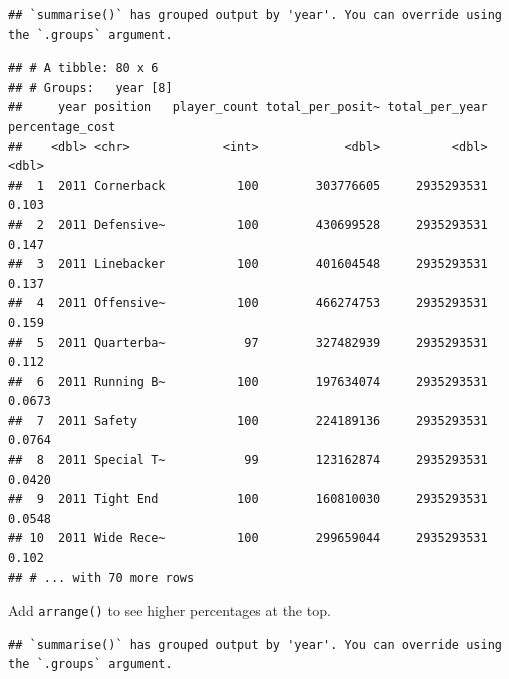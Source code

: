 \documentclass[
]{book}
\newenvironment{Shaded}{\begin{snugshade}}{\end{snugshade}}
\newcommand{\DataTypeTok}[1]{\textcolor[rgb]{0.13,0.29,0.53}{#1}}
\newcommand{\KeywordTok}[1]{\textcolor[rgb]{0.13,0.29,0.53}{\textbf{#1}}}
\newcommand{\NormalTok}[1]{#1}
\newcommand{\OperatorTok}[1]{\textcolor[rgb]{0.81,0.36,0.00}{\textbf{#1}}}
\newcommand{\StringTok}[1]{\textcolor[rgb]{0.31,0.60,0.02}{#1}}
\begin{document}
\begin{verbatim}
## `summarise()` has grouped output by 'year'. You can override using the `.groups` argument.
\end{verbatim}

\begin{verbatim}
## # A tibble: 80 x 6
## # Groups:   year [8]
##     year position   player_count total_per_posit~ total_per_year percentage_cost
##    <dbl> <chr>             <int>            <dbl>          <dbl>           <dbl>
##  1  2011 Cornerback          100        303776605     2935293531          0.103 
##  2  2011 Defensive~          100        430699528     2935293531          0.147 
##  3  2011 Linebacker          100        401604548     2935293531          0.137 
##  4  2011 Offensive~          100        466274753     2935293531          0.159 
##  5  2011 Quarterba~           97        327482939     2935293531          0.112 
##  6  2011 Running B~          100        197634074     2935293531          0.0673
##  7  2011 Safety              100        224189136     2935293531          0.0764
##  8  2011 Special T~           99        123162874     2935293531          0.0420
##  9  2011 Tight End           100        160810030     2935293531          0.0548
## 10  2011 Wide Rece~          100        299659044     2935293531          0.102 
## # ... with 70 more rows
\end{verbatim}

Add \texttt{arrange()} to see higher percentages at the top.

\begin{Shaded}
\end{Shaded}

\begin{verbatim}
## `summarise()` has grouped output by 'year'. You can override using the `.groups` argument.
\end{verbatim}
\end{document}
